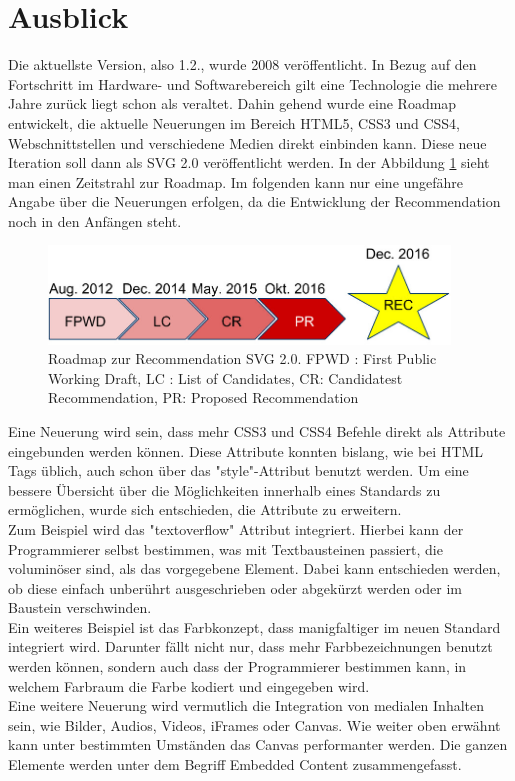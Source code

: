 \section{Ausblick}
Die aktuellste Version, also 1.2., wurde 2008 veröffentlicht. In Bezug auf den Fortschritt im Hardware- und Softwarebereich gilt eine Technologie die mehrere Jahre zurück liegt schon als veraltet. Dahin gehend wurde eine Roadmap entwickelt, die aktuelle Neuerungen im Bereich HTML5, CSS3 und CSS4, Webschnittstellen und verschiedene Medien direkt einbinden kann. Diese neue Iteration soll dann als SVG 2.0 veröffentlicht werden. In der Abbildung \ref{roadmap} sieht man einen Zeitstrahl zur Roadmap. Im folgenden kann nur eine ungefähre Angabe über die Neuerungen erfolgen, da die Entwicklung der Recommendation noch in den Anfängen steht.\\

\begin{figure}[!ht]
  \centering
  \includegraphics[width=0.95\textwidth]{pictures/roadmap.jpg}
  \caption{Roadmap zur Recommendation SVG 2.0. FPWD : First Public Working Draft,
    LC : List of Candidates,
    CR: Candidatest Recommendation,
  PR: Proposed Recommendation}
  \label{roadmap}
\end{figure}
Eine Neuerung wird sein, dass mehr CSS3 und CSS4 Befehle direkt als Attribute eingebunden werden können. Diese Attribute konnten bislang, wie bei HTML Tags üblich, auch schon über das "style"-Attribut benutzt werden. Um eine bessere Übersicht über die Möglichkeiten innerhalb eines Standards zu ermöglichen, wurde sich entschieden, die Attribute zu erweitern.\\
Zum Beispiel wird das "textoverflow" Attribut integriert. Hierbei kann der Programmierer selbst bestimmen, was mit Textbausteinen passiert, die voluminöser sind, als das vorgegebene Element. Dabei kann entschieden werden, ob diese einfach unberührt ausgeschrieben oder abgekürzt werden oder im Baustein verschwinden. \\
Ein weiteres Beispiel ist das Farbkonzept, dass manigfaltiger im neuen Standard integriert wird. Darunter fällt nicht nur, dass mehr Farbbezeichnungen benutzt werden können, sondern auch dass der Programmierer bestimmen kann, in welchem Farbraum die Farbe kodiert und eingegeben wird.\\

Eine weitere Neuerung wird vermutlich die Integration von medialen Inhalten sein, wie Bilder, Audios, Videos, iFrames oder Canvas. Wie weiter oben erwähnt kann unter bestimmten Umständen das Canvas performanter werden. Die ganzen Elemente werden unter dem Begriff Embedded Content zusammengefasst.\\

\newpage


